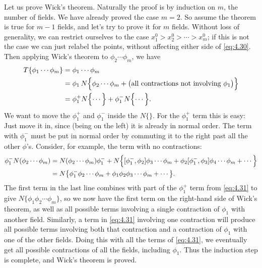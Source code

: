 Let us prove Wick's theorem.  Naturally the proof is by induction on $m$,
the number of fields.  We have already proved the case $m=2$.  So assume the
theorem is true for $m-1$ fields, and let's try to prove it for $m$ fields.
Without loss of generality, we can restrict ourselves to the case
$x^0_1 > x^0_2 > \cdots > x^0_m$; if this is not the case we can just relabel
the points, without affecting either side of \eqref{eq:4.30}.  Then applying
Wick's theorem to $\phi_2\cdots\phi_m$, we have
\begin{equation}
  \begin{aligned}
    T\{\phi_1\cdots\phi_m\} &= \phi_1\cdots\phi_m\\
    &= \phi_1\,N\Bigl\{ \phi_2\cdots\phi_m + \bigl(\text{all contractions}
      \text{ not involving } \phi_1\bigr) \Bigr\}\\
    &= \phi_1^+N\Bigl\{ \cdots \Bigr\}
      + \phi_1^-N\Bigl\{ \cdots \Bigr\} .
  \end{aligned}
  \label{eq:4.31}
\end{equation}
We want to move the $\phi_1^+$ and $\phi_1^-$ inside the $N\{\}$.  For the
$\phi_1^+$ term this is easy: Just move it in, since (being on the left) it is
already in normal order.  The term with $\phi_1^-$ must be put in normal
order by commuting it to the right past all the other $\phi$'s.  Consider,
for example, the term with no contractions:
\begin{equation}
  \begin{aligned}
    \phi_1^-N(\phi_2\cdots\phi_m) &= N(\phi_2\cdots\phi_m)\phi_1^-
      + N\Bigl\{ [\phi_1^-, \phi_2]\phi_3\cdots\phi_m
        + \phi_2[\phi_1^-, \phi_3]\phi_4\cdots\phi_m + \cdots \Bigr\}\\
    &= N\bigl\{ \phi_1^-\phi_2\cdots\phi_m
      + \phi_1\phi_2\phi_3\cdots\phi_m + \cdots \bigr\} .
  \end{aligned}
  \label{eq:4.32}
\end{equation}
The first term in the last line combines with part of the $\phi_1^+$ term
from \eqref{eq:4.31} to give $N\{\phi_1\phi_2\cdots\phi_m\}$, so we now have
the first term on the right-hand side of Wick's theorem, as well as all
possible terms involving a single contraction of $\phi_1$ with another field.
Similarly, a term in \eqref{eq:4.31} involving one contraction will produce
all possible terms involving both that contraction and a contraction of
$\phi_1$ with one of the other fields.  Doing this with all the terms of
\eqref{eq:4.31}, we eventually get all possible contractions of all the
fields, including $\phi_1$.  Thus the induction step is complete, and Wick's
theorem is proved.

